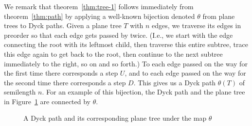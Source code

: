 \documentclass[reqno]{amsart}
\numberwithin{equation}{section}
\theoremstyle{definition}
\theoremstyle{named}
\begin{document}
We remark that theorem~\ref{thm:tree-1} follows immediately from theorem~\ref{thm:path} by applying a well-known bijection denoted $\theta$ from plane trees to Dyck paths. Given a plane tree $T$ with $n$ edges, we traverse its edges in preorder so that each edge gets passed by twice. (I.e., we start with the edge connecting the root with its leftmost child, then traverse this entire subtree, trace this edge again to get back to the root, then continue to the next subtree immediately to the right, so on and so forth.) To each edge passed on the way for the first time there corresponds a step $U$, and to each edge passed on the way for the second time there corresponds a step $D$. This gives us a Dyck path $\theta(T)$ of semilength $n$. For an example of this bijection, the Dyck path and the plane tree in Figure~\ref{fig:Dyck-tree} are connected by $\theta$.


\begin{figure}[!ht]
	\centering
	\hfill
	\caption{A Dyck path and its corresponding plane tree under the map $\theta$}\label{fig:Dyck-tree}
\end{figure}
\end{document}
